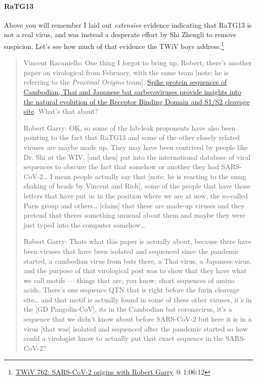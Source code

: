\documentclass[11pt]{article}
\begin{document}
\paragraph{RaTG13}
\label{sec:orgf88ead6}
Above you will remember I laid out \emph{extensive} evidence indicating that RaTG13 is not a real virus, and was instead a desperate effort by Shi Zhengli to remove suspicion. Let's see how much of that evidence the TWiV boys address:\footnote{\href{https://youtu.be/IxwrDSYrhjU?t=3972}{TWiV 762: SARS-CoV-2 origins with Robert Garry} @ 1:06:12}
\begin{quote}
Vincent Racaniello: One thing I forgot to bring up, Robert, there's another paper on virological from February, with the same team [note: he is referring to the \emph{Proximal Origins} team], \href{https://virological.org/t/spike-protein-sequences-of-cambodian-thai-and-japanese-bat-sarbecoviruses-provide-insights-into-the-natural-evolution-of-the-receptor-binding-domain-and-s1-s2-cleavage-site/622}{Spike protein sequences of Cambodian, Thai and Japanese bat sarbecoviruses provide insights into the natural evolution of the Receptor Binding Domain and S1/S2 cleavage site}. What's that about?

Robert Garry: OK, so some of the lab-leak proponents have also been pointing to the fact that RaTG13 and some of the other closely related viruses are maybe made up. They may have been contrived by people like Dr. Shi at the WIV, [and then] put into the international database of viral sequences to obscure the fact that somehow or another they had SARS-CoV-2\ldots{} I mean people actually say that [note: he is reacting to the smug shaking of heads by Vincent and Rich], some of the people that have those letters that have put us in the position where we are at now, the so-called Paris group and others\ldots{} [claim] that these are made-up viruses and they pretend that theres something unusual about them and maybe they were just typed into the computer somehow\ldots{}

Robert Garry: Thats what this paper is actually about, because there have been viruses that have been isolated and sequenced since the pandemic started, a cambodian virus from bats there, a Thai virus, a Japanese virus, and the purpose of that virological post was to show that they have what we call motifs --- things that are, you know, short sequences of amino acids. There's one sequence QTN that is right before the furin cleavage site\ldots{} and that motif is actually found in some of these other viruses, it's in the [GD Pangolin-CoV], its in the Cambodian bat coronavirus, it's a sequence that we didn't know about before SARS-CoV-2 but here it is in a virus [that was] isolated and sequenced after the pandemic started so how could a virologist know to actually put that exact sequence in the SARS-CoV-2?
\end{quote}
\end{document}
